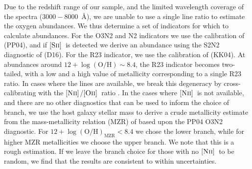 \documentclass[fleqn,usenatbib,]{mnras}
\newcommand{\OII}[0]{$[\textnormal{\textsc{Oii}}]$}
\newcommand{\SII}[0]{$[\textnormal{\textsc{Sii}}]$}
\newcommand{\NII}[0]{$[\textnormal{\textsc{Nii}}]$}
\begin{document}
Due to the redshift range of our sample, and the limited wavelength coverage of the spectra ($3000-8000$~\AA), we are unable to use a single line ratio to estimate the oxygen abundances. We thus determine a set of indicators for which to calculate abundances. For the O3N2 and N2 indicators we use the calibration of \citet{Pettini2004} (PP04), and if \SII~is detected we derive an abundance using the S2N2 diagnostic of \citet{Dopita2016} (D16). For the R23 indicator, we use the calibration of \citet{Kobulnicky2004} (KK04). At abundances around $12 + \log \mathrm{(O/H)} \sim 8.4$, the R23 indicator becomes two-tailed, with a low and a high value of metallicity corresponding to a single R23 ratio. In cases where the lines are available, we break this degeneracy by cross-calibrating with the \NII/\OII~ratio \citep{Kewley2008}. In the cases where \NII~is not available, and there are no other diagnostics that can be used to inform the choice of branch, we use the host galaxy stellar mass to derive a crude metallicity estimate from the mass-metallicity relation (MZR) of \citet{Kewley2008} based upon the PP04 O3N2 diagnostic. For $12 + \log \mathrm{(O/H)}_{\mathrm{MZR}} < 8.4$ we chose the lower branch, while for higher MZR metallicities we choose the upper branch. We note that this is a rough estimation. If we leave the branch choice for those with no \NII~to be random, we find that the results are consistent to within uncertainties. 
\end{document}
